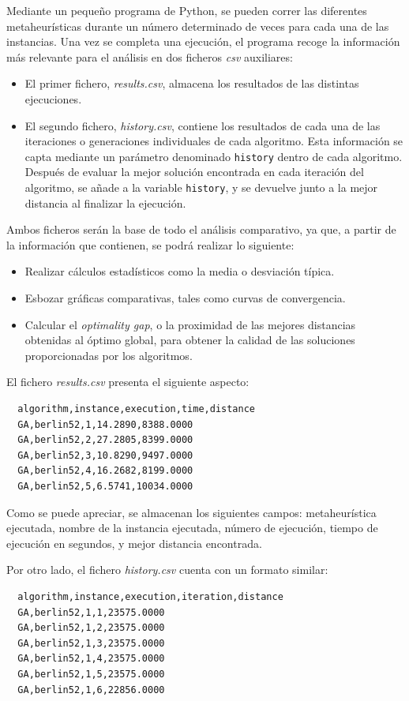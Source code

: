 Mediante un pequeño programa de Python, se pueden correr las diferentes metaheurísticas durante un número determinado de
veces para cada una de las instancias. Una vez se completa una ejecución, el programa recoge la información más relevante para 
el análisis en dos ficheros \textit{csv} auxiliares:
\begin{itemize}
  \item El primer fichero, \textit{results.csv}, almacena los resultados de las distintas ejecuciones.
  \item El segundo fichero, \textit{history.csv}, contiene los resultados de cada una de las iteraciones o generaciones
  individuales de cada algoritmo. Esta información se capta mediante un parámetro denominado \texttt{history} dentro de 
  cada algoritmo. Después de evaluar la mejor solución encontrada en cada iteración del algoritmo, se añade a la variable
  \texttt{history}, y se devuelve junto a la mejor distancia al finalizar la ejecución.
\end{itemize}
Ambos ficheros serán la base de todo el análisis comparativo, ya que, a partir de la información que contienen, se podrá
realizar lo siguiente:
\begin{itemize}
  \item Realizar cálculos estadísticos como la media o desviación típica.
  \item Esbozar gráficas comparativas, tales como curvas de convergencia.
  \item Calcular el \textit{optimality gap}, o la proximidad de las mejores distancias obtenidas al óptimo global, para obtener
  la calidad de las soluciones proporcionadas por los algoritmos.
\end{itemize}

El fichero \textit{results.csv} presenta el siguiente aspecto:

\begin{verbatim}
  algorithm,instance,execution,time,distance
  GA,berlin52,1,14.2890,8388.0000
  GA,berlin52,2,27.2805,8399.0000
  GA,berlin52,3,10.8290,9497.0000
  GA,berlin52,4,16.2682,8199.0000
  GA,berlin52,5,6.5741,10034.0000
\end{verbatim}

Como se puede apreciar, se almacenan los siguientes campos: metaheurística ejecutada, nombre de la instancia ejecutada, número
de ejecución, tiempo de ejecución en segundos, y mejor distancia encontrada.

Por otro lado, el fichero \textit{history.csv} cuenta con un formato similar:
\begin{verbatim}
  algorithm,instance,execution,iteration,distance
  GA,berlin52,1,1,23575.0000
  GA,berlin52,1,2,23575.0000
  GA,berlin52,1,3,23575.0000
  GA,berlin52,1,4,23575.0000
  GA,berlin52,1,5,23575.0000
  GA,berlin52,1,6,22856.0000
\end{verbatim}

